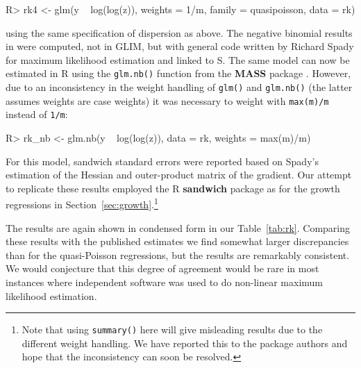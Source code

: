 \documentclass[10pt,a4paper,twoside]{article}
\let\code=\texttt
\let\pkg=\textbf
\let\proglang=\textsf
\newenvironment{Schunk}{}{}
\begin{document}
\begin{Schunk}
\begin{Sinput}
R> rk4 <- glm(y ~ log(log(z)), weights = 1/m, family = quasipoisson, data = rk)
\end{Sinput}
\end{Schunk}
using the same specification of dispersion as above. 
The negative binomial results in \cite{repro:Koenker:1988} were computed, not
in \proglang{GLIM}, but with general code written by Richard Spady for maximum
likelihood estimation and linked to \proglang{S}. The same model can now
be estimated in \proglang{R} using the \code{glm.nb()} function from the 
\pkg{MASS} package \citep{repro:Venables+Ripley:2002}. However, due to an inconsistency
in the weight handling of \code{glm()} and \code{glm.nb()} (the latter assumes weights
are case weights) it was necessary to weight with \code{max(m)/m} instead of \code{1/m}:

\begin{Schunk}
\begin{Sinput}
R> rk_nb <- glm.nb(y ~ log(log(z)), data = rk, weights = max(m)/m)
\end{Sinput}
\end{Schunk}

For this model, sandwich standard errors were reported based on Spady's 
estimation of the Hessian and outer-product matrix of the gradient.  Our
attempt to replicate these results  employed the \proglang{R} \pkg{sandwich}
package as for the growth regressions in Section~\ref{sec:growth}.\footnote{Note that
using \code{summary()} here will give misleading results due to the different weight 
handling.  We have reported this to the package authors and hope that the 
inconsistency can soon be resolved.}

The results are again shown in condensed form in our Table~\ref{tab:rk}. 
Comparing these results with the published estimates we find somewhat larger 
discrepancies than for the quasi-Poisson regressions, but the results are
remarkably consistent.  We would conjecture that this degree of agreement 
would be rare in most instances where independent software was used to do
non-linear maximum likelihood estimation.
\end{document}
